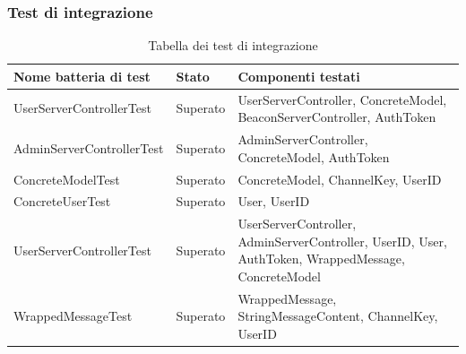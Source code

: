 		\subsubsection{Test di integrazione}
		\begin{table}[H]
			\centering
			\begin{tabularx}{\textwidth}{ X X X }
				\toprule
				\textbf{Nome batteria di test} & \textbf{Stato} & \textbf{Componenti testati} \\
				\midrule
				UserServerControllerTest 	& Superato  & 	UserServerController,\newline{}
																		ConcreteModel,\newline{}
																		BeaconServerController,\newline{}
																		AuthToken \\
				AdminServerControllerTest 	& Superato 	& 	AdminServerController,\newline{}
																		ConcreteModel,\newline{}
																		AuthToken \\
				ConcreteModelTest 			& Superato 	& 	ConcreteModel,\newline{}
																		ChannelKey,\newline{}
																		UserID \\
				ConcreteUserTest 				& Superato 	& 	User,\newline{}
																		UserID \\
				UserServerControllerTest 	& Superato 	& 	UserServerController,\newline{}
																		AdminServerController,\newline{}
																		UserID,\newline{}
																		User,\newline{}
																		AuthToken,\newline{}
																		WrappedMessage,\newline{}
																		ConcreteModel \\
				WrappedMessageTest 			& Superato	&	WrappedMessage,\newline{}
																		StringMessageContent,\newline{}
																		ChannelKey,\newline{}
																		UserID \\

			\end{tabularx}
			\caption{Tabella dei test di integrazione}	
		\end{table}

